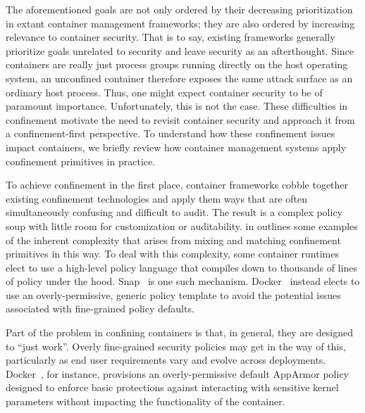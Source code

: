 The aforementioned goals are not only ordered by their decreasing prioritization in extant
container management frameworks; they are also ordered by increasing relevance to
container security. That is to say, existing frameworks generally prioritize goals
unrelated to security and leave security as an afterthought. Since containers are really
just process groups running directly on the host operating system, an unconfined container
therefore exposes the same attack surface as an ordinary host process. Thus, one might
expect container security to be of paramount importance. Unfortunately, this is not the
case. These difficulties in confinement motivate the need to revisit container security
and approach it from a confinement-first perspective. To understand how these confinement
issues impact containers, we briefly review how container management systems apply
confinement primitives in practice.

To achieve confinement in the first place, container frameworks cobble together existing
confinement technologies and apply them ways that are often simultaneously confusing and
difficult to audit. The result is a complex policy soup with little room for customization
or auditability.  in  outlines some examples
of the inherent complexity that arises from mixing and matching confinement primitives in
this way. To deal with this complexity, some container runtimes elect to use a high-level
policy language that compiles down to thousands of lines of policy under the hood. Snap~\cite{snap}
is one such mechanism. Docker~\cite{docker_security, docker_default_apparmor, docker_apparmor} instead
elects to use an overly-permissive, generic policy template to avoid the potential issues
associated with fine-grained policy defaults.


Part of the problem in confining containers is that, in general, they are designed to
\enquote{just work}. Overly fine-grained security policies may get in the way of this,
particularly as end user requirements vary and evolve across deployments.
Docker~\cite{docker_security}, for instance, provisions an overly-permissive default
AppArmor policy~\cite{docker_default_apparmor} designed to enforce basic protections
against interacting with sensitive kernel parameters without impacting the functionality
of the container.

